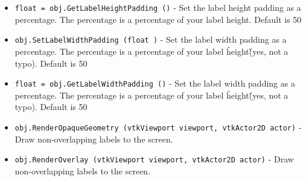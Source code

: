 \begin{itemize}
\item  \verb|float = obj.GetLabelHeightPadding ()| -  Set the label height padding as a percentage. The percentage 
 is a percentage of your label height. 
 Default is 50%

\item  \verb|obj.SetLabelWidthPadding (float )| -  Set the label width padding as a percentage. The percentage 
 is a percentage of your label \^height\^ (yes, not a typo). 
 Default is 50%

\item  \verb|float = obj.GetLabelWidthPadding ()| -  Set the label width padding as a percentage. The percentage 
 is a percentage of your label \^height\^ (yes, not a typo). 
 Default is 50%

\item  \verb|obj.RenderOpaqueGeometry (vtkViewport viewport, vtkActor2D actor)| -  Draw non-overlapping labels to the screen.

\item  \verb|obj.RenderOverlay (vtkViewport viewport, vtkActor2D actor)| -  Draw non-overlapping labels to the screen.

\end{itemize}
